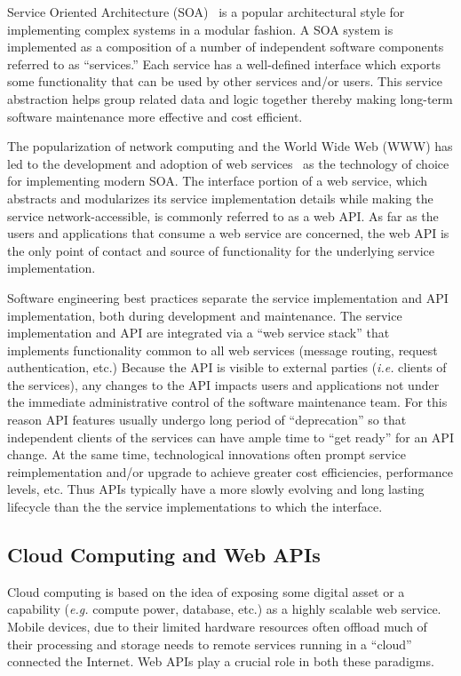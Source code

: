 Service Oriented Architecture (SOA)~\cite{Haines:2010:SAM:1787234.1787269} is a popular architectural style for
implementing complex systems in a modular fashion. A SOA system
is implemented as a composition of a number of independent software components
referred to as ``services.'' Each service has a well-defined interface which
exports some functionality that can be used by other services and/or users.
This service abstraction helps group related data and logic together thereby
making long-term software maintenance more effective and cost efficient. 

The popularization of network computing and the World Wide Web (WWW) 
has led to the development and adoption of web services~\cite{6094008} as
the technology of choice for implementing modern SOA.  The
interface portion of a web service, which abstracts and modularizes
its service implementation
details while making the service network-accessible, is commonly referred to
as a web API. As far as the users and applications that consume a web service
are concerned, the web API is the only point of contact and source of
functionality for the underlying service implementation.

Software engineering best practices separate the service implementation
and API implementation, both during development and maintenance.
The service implementation and API are integrated via 
a ``web service stack'' that implements functionality common to all web
services (message routing, request authentication, etc.)
Because the API is visible to external parties ({\em i.e.} clients of the
services), any changes to the API
impacts users and applications not under the immediate administrative control
of the software maintenance team.  For this reason API features 
usually undergo long
period of ``deprecation'' so that independent clients of the services can have
ample time to ``get ready'' for an API change.  At the same time,
technological innovations often prompt service reimplementation and/or 
upgrade to
achieve greater cost efficiencies, performance levels, etc.
Thus APIs typically have a more
slowly evolving and long lasting lifecycle than the the service
implementations
to which the interface. 

\subsection{Cloud Computing and Web APIs}
Cloud computing is based on the idea of exposing some digital asset or a
capability ({\em e.g.} compute power, database, etc.) 
as a highly scalable web service.  Mobile
devices, due to their limited hardware resources often offload much of their
processing and storage needs to remote services running in a ``cloud''
connected the Internet.  Web APIs
play a crucial role in both these paradigms. 


